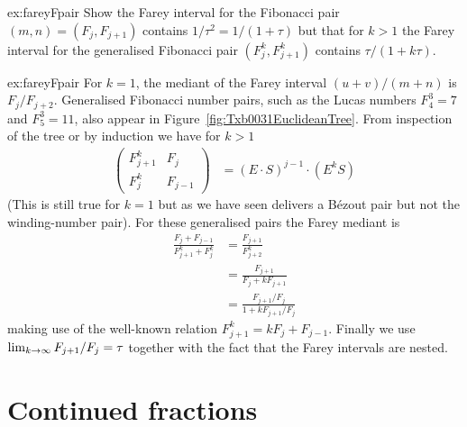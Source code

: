 \begin{jExercise}{ex:fareyFpair}
	Show  the Farey interval for the Fibonacci pair $(m,n)= (F_j,F_{j+1})$ contains $1/\tau^2=1/(1+\tau)$ but that for $k>1$ the Farey interval for the generalised Fibonacci pair $(F^k_j,F^k_{j+1})$ contains $\tau/(1+ k \tau)$.
\end{jExercise}
\begin{jAnswer}{ex:fareyFpair}  
For  $k=1$, the mediant of the Farey interval $(u+v)/(m+n)$ is $F_j/F_{j+2}$. 
Generalised Fibonacci number pairs, such as the Lucas numbers $F^3_4=7$ and $F^3_5=11$, also appear in Figure~\ref{fig:Txb0031EuclideanTree}. From inspection of the tree or by induction we have for $k>1$
\begin{align}
	\begin{pmatrix} 
		F^k_{j+1} & F_j 
		\\
		F^k_j & F_{j-1}
	\end{pmatrix} &= 	(E\cdot  S)^{j-1} \cdot  (E^k S) 
	\label{eq:GeneralizedFibonacciMatrix}
\end{align}
(This is still true for $k=1$ but as we have seen delivers a B\'ezout pair but not the winding-number pair). For these generalised pairs the Farey mediant is 
\begin{align}
	\frac{	 F_j + F_{j-1}}{F^k_{j+1}+F^k_{j}}&=	\frac{	 F_{j+1}}{F^k_{j+2}}
\\
	&= 	\frac{	 F_{j+1}}{F_{j} + k F_{j+1}}
		\\&= \frac{ F_{j+1}/F_{j}}{1+ k F_{j+1}/F_{j}}
\end{align}	
making use of the well-known relation $	F^k_{j+1} =   k F_j+ F_{j-1}$. Finally we use $\lim_{ k\rightarrow \infty}  F_{j+1}/F_{j}=\tau$ together with the fact that the Farey intervals are nested.

\end{jAnswer}

\section{Continued fractions}

